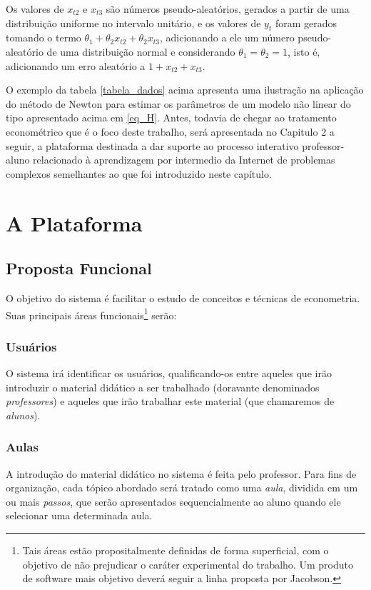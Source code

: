 \documentclass{abnt}
\begin{document}
	Os valores de $x_{t2}$ e $x_{t3}$ são números pseudo-aleatórios, gerados a partir de uma distribuição uniforme no intervalo unitário, e os valores de $y_t$ foram gerados tomando o termo $\theta_1 + \theta_2x_{t2}+\theta_2x_{t3}$, adicionando a ele um número pseudo-aleatório de uma distribuição normal e considerando $\theta_1 = \theta_2 = 1$, isto é, adicionando um erro aleatório a $1+x_{t2}+x_{t3}$.







	O exemplo da tabela \ref{tabela_dados} acima apresenta uma ilustração na aplicação do método de Newton para estimar os parâmetros de um modelo não linear do tipo apresentado acima em \ref{eq_H}. Antes, todavia de chegar ao tratamento econométrico que é o foco deste trabalho, será apresentada no Capitulo 2 a seguir, a plataforma destinada a dar suporte ao processo interativo professor-aluno relacionado à aprendizagem por intermedio da Internet de problemas complexos semelhantes ao que foi introduzido neste capítulo.



\chapter {A Plataforma}

\section{Proposta Funcional}


	O objetivo do sistema é facilitar o estudo de conceitos e técnicas de econometria. Suas principais áreas funcionais\footnote{Tais áreas estão propositalmente definidas de forma superficial, com o objetivo de não prejudicar o caráter experimental do trabalho. Um produto de software mais objetivo deverá seguir a linha proposta por Jacobson\cite{Jacobson}.} serão:

\subsection{Usuários}


	O sistema irá identificar os usuários, qualificando-os entre aqueles que irão introduzir o material didático a ser trabalhado (doravante denominados \textit{professores}) e aqueles que irão trabalhar este material (que chamaremos de \textit{alunos}).
\subsection{Aulas}
	A introdução do material didático no sistema é feita pelo professor. Para fins de organização, cada tópico abordado será tratado como uma \textit{aula}, dividida em um ou mais \textit{passos}, que serão apresentados sequencialmente ao aluno quando ele selecionar uma determinada aula.
\end{document}
